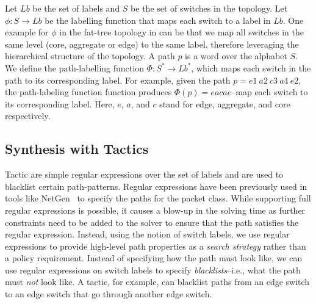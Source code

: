  Let $Lb$ be the set of labels and $S$ be the set of switches in the topology. Let $\phi : S \rightarrow Lb$ be the labelling function that maps each switch to a label in $Lb$. One example for $\phi$ in the fat-tree topology in  can be that we map all switches in the same level (core, aggregate or edge) to the same label,
therefore leveraging the hierarchical structure of the topology. A path $p$ is a word over the alphabet $S$. 
We define the path-labelling function $\Phi : S^* \rightarrow Lb^*$,  which maps each switch in the path to its corresponding 
 label. 
 For example, given the path $p = e1\ a2\ c3\ a4\ e2$, the path-labeling function function produces $\Phi(p) = eacae$--map each switch to its corresponding label.
 Here, $e$, $a$, and $c$ stand for edge, aggregate, and core respectively.

\subsection{Synthesis with Tactics}
Tactic are simple regular expressions over the set of labels and are used to blacklist certain path-patterns.
Regular expressions have been previously used in tools like
NetGen~\cite{netgen} to specify the paths for the packet class.
While supporting full regular expressions is possible, it causes a blow-up in the solving time as further
constraints need to be added to the solver to ensure that the path satisfies the regular expression. 
Instead, using the notion of switch labels, we use regular expressions to provide high-level path properties as a {\em search strategy} rather than a policy requirement. Instead of specifying how the path must look like, we can use regular expressions on switch labels to specify \emph{blacklists}--i.e.,
what the path must \emph{not} look like. A tactic, for example, can blacklist paths from an edge switch to an edge switch that go through another edge switch. 
 
